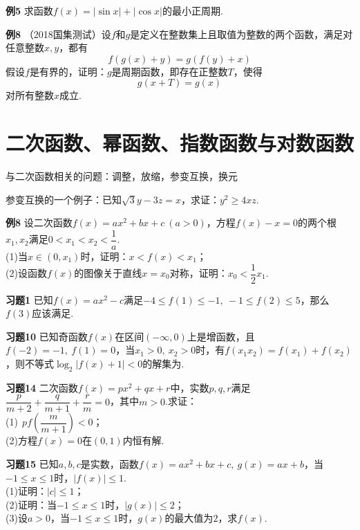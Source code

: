 \documentclass[lang=cn, zihao=4.5]{elegantbook}
\newcommand{\tk}{\uline{\hspace{4em}}}
\newcommand{\ssb}[1]{\left( #1 \right)}
\begin{document}
\vspace{30em}
\noindent %
	\textbf{例5} \quad 求函数$f(x)=|\sin x|+|\cos x|$的最小正周期.
	
\newpage
\noindent %
	\textbf{例8} \quad （2018国集测试）设$f$和$g$是定义在整数集上且取值为整数的两个函数，满足对任意整数$x,y$，都有$$f(g(x)+y)=g(f(y)+x)$$
	假设$f$是有界的，证明：$g$是周期函数，即存在正整数$T$，使得$$g(x+T)=g(x)$$
	对所有整数$x$成立.
	
\newpage
\section{二次函数、幂函数、指数函数与对数函数}

与二次函数相关的问题：调整，放缩，参变互换，换元

参变互换的一个例子：已知$\sqrt{3}y - 3z = x$，求证：$y^2 \geq 4xz$.

\vspace{24em}
\noindent %
	\textbf{例8} \quad 设二次函数$f(x)=ax^2+bx+c~(a>0)$，方程$f(x)-x=0$的两个根$x_1,x_2$满足$0<x_1<x_2< \dfrac{1}{a}$. \\
	(1)当$x \in (0,x_1)$时，证明：$x<f(x)<x_1$； \\
	(2)设函数$f(x)$的图像关于直线$x=x_0$对称，证明：$x_0 < \dfrac{1}{2}x_1$.

\newpage
\noindent %
	\textbf{习题1} \quad 已知$f(x)=ax^2-c$满足$-4 \leq f(1) \leq -1,~ -1 \leq f(2) \leq 5$，那么$f(3)$应该满足\tk .

\vspace{30em}
\noindent %
	\textbf{习题10} \quad 已知奇函数$f(x)$在区间$(-\infty ,0)$上是增函数，且$f(-2)=-1,~f(1)=0$，当$x_1>0,~ x_2>0$时，有$f(x_1x_2)=f(x_1)+f(x_2)$，则不等式$\log_{2}{|f(x)+1|}<0$的解集为\tk .
	
\newpage
\noindent %
	\textbf{习题14} \quad 二次函数$f(x)=px^2+qx+r$中，实数$p,q,r$满足$\dfrac{p}{m+2}+\dfrac{q}{m+1}+\dfrac{r}{m}=0$，其中$m>0$.求证： \\
	(1)$~~pf \ssb{\dfrac{m}{m+1}} < 0$； \\
	(2)方程$f(x)=0$在$(0,1)$内恒有解.
	
\vspace{30em}
\noindent %
	\textbf{习题15} \quad 已知$a,b,c$是实数，函数$f(x)=ax^2+bx+c,~g(x)=ax+b$，当$-1 \leq x \leq 1$时，$|f(x)| \leq 1$. \\
	(1)证明：$|c| \leq 1$； \\
	(2)证明：当$-1 \leq x \leq 1$时，$|g(x)| \leq 2$； \\
	(3)设$a>0$，当$-1 \leq x \leq 1$时，$g(x)$的最大值为$2$，求$f(x)$.
\end{document}
